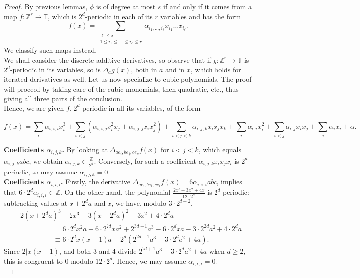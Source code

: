 \documentclass[a4paper,11pt]{article}
\numberwithin{theorem}{section}
\theoremstyle{definition}
\newcommand\ssk[1]{
	\substack{#1}
}
\begin{document}
\begin{proof}
    By previous lemmas, $\phi$ is of degree at most $s$ if and only if it comes from a map $f : \mathbb{Z}^r \to \mathbb{T}$, which is $2^d$-periodic in each of its $r$ variables and has the form 
    \[f(x) = \sum_{\ssk{\ell \leq s\\1\leq i_1 \leq \dots \leq i_\ell \leq r}} \alpha_{i_1, \dots, i_\ell} x_{i_1} \dots x_{i_\ell}.\] 
    We classify such maps instead.\\
    
    We shall consider the discrete additive derivatives, so observe that if $g :\mathbb{Z}^r \to \mathbb{T}$ is $2^d$-periodic in its variables, so is $\Delta_a g(x)$, both in $a$ and in $x$, which holds for iterated derivatives as well. Let us now specialize to cubic polynomials. The proof will proceed by taking care of the cubic monomials, then quadratic, etc., thus giving all three parts of the conclusion.\\

    Hence, we are given $f$, $2^d$-periodic in all its variables, of the form

    \[f(x) = \sum_{i} \alpha_{i,i,i} x_i^3 + \sum_{i < j} (\alpha_{i, i, j}x_i^2 x_j + \alpha_{i, j, j} x_i x_j^2) + \sum_{i < j < k} \alpha_{i,j,k}x_ix_jx_k + \sum_{i} \alpha_{i,i} x_i^2 + \sum_{i < j} \alpha_{i,j} x_i x_j + \sum_i \alpha_i x_i + \alpha.\]

    \noindent\textbf{Coefficients $\alpha_{i,j,k}$.} By looking at $\Delta_{ae_i, be_j, ce_k}f(x)$ for $i < j < k$, which equals $\alpha_{i,j,k} abc$, we obtain $\alpha_{i,j,k} \in \frac{\mathbb{Z}}{2^d}$. Conversely, for such a coefficient $\alpha_{i,j,k} x_ix_jx_l$ is $2^d$-periodic, so may assume $\alpha_{i,j,k} = 0$.\\

    \noindent\textbf{Coefficients $\alpha_{i,i,i}$.} Firstly, the derivative $\Delta_{ae_i, be_i, ce_i}f(x) = 6\alpha_{i,i,i} abc$, implies that $6\cdot 2^d\alpha_{i,i,i} \in \mathbb{Z}$. On the other hand, the polynomial $\frac{2x^3 - 3x^2 + 4x}{12\cdot 2^d}$ is $2^d$-periodic: subtracting values at $x + 2^d a$ and $x$, we have, modulo $3\cdot 2^{d+2}$,
    \begin{align*}&2(x+2^da)^3  -2x^3- 3(x + 2^da)^2  + 3 x^2 + 4\cdot2^da\\
    &\hspace{2cm}= 6 \cdot 2^d x^2 a + 6 \cdot 2^{2d} x a^2 + 2^{3d + 1} a^3 - 6\cdot 2^d xa - 3 \cdot 2^{2d} a^2 + 4\cdot2^da\\
    &\hspace{2cm}\equiv 6 \cdot 2^d x(x-1) a + 2^d(2^{2d + 1} a^3 - 3 \cdot 2^{d} a^2 + 4a).\end{align*}
    Since $2|x(x-1)$, and both 3 and 4 divide $2^{2d + 1} a^3 - 3 \cdot 2^{d} a^2 + 4a$ when $d \geq 2$, this is congruent to 0 modulo $12\cdot 2^d$. Hence, we may assume $\alpha_{i,i,i} = 0$.\\
    

\end{proof}
\end{document}
